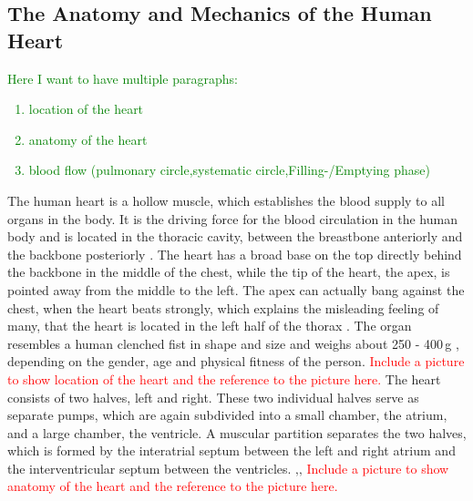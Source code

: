 \subsection{The Anatomy and Mechanics of the Human Heart}
\label{anatomy}
\textcolor{green}{
	Here I want to have multiple paragraphs:
	\begin{enumerate}
  		\item location of the heart  
  		\item anatomy of the heart
  		\item blood flow (pulmonary circle,systematic circle,Filling-/Emptying phase)
	\end{enumerate}
}
The human heart is a hollow muscle, which establishes the blood supply to all organs in the body. It is the driving force for the blood circulation in the human body and is located in the thoracic cavity, between the breastbone anteriorly and the backbone posteriorly \cite{sherwood07}. The heart has a broad base on the top directly behind the backbone in the middle of the chest, while the tip of the heart, the apex, is pointed away from the middle to the left. The apex can actually bang against the chest, when the heart beats strongly, which explains the misleading feeling of many, that the heart is located in the left half of the thorax \cite{sherwood07}. The organ resembles a human clenched fist in shape and size and weighs about 250 - 400\,g \cite{schwegler11}, depending on the gender, age and physical fitness of the person. \textcolor{red}{Include a picture to show location of the heart and the reference to the picture here.} 
\newline
The heart consists of two halves, left and right. These two individual halves serve as separate pumps, which are again subdivided into a small chamber, the atrium, and a large chamber, the ventricle. A muscular partition separates the two halves, which is formed by the interatrial septum between the left and right atrium and the interventricular septum between the ventricles. ‚‚
\textcolor{red}{Include a picture to show anatomy of the heart and the reference to the picture here.} 
\newline





